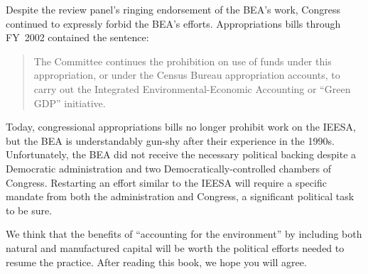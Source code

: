 Despite the review panel's ringing endorsement of the BEA's work,
Congress continued to expressly forbid the BEA's efforts.
Appropriations bills through FY~2002 contained the sentence:

\begin{quote}
	The Committee continues the prohibition on use of funds under this appropriation,
	or under the Census Bureau appropriation accounts,
	to carry out the Integrated Environmental-Economic Accounting or ``Green GDP'' initiative.
\end{quote}

Today, congressional appropriations bills no longer prohibit work on the IEESA,
but the BEA is understandably gun-shy after their experience in the 1990s.
Unfortunately, the BEA did not receive the necessary political backing
despite a Democratic administration
and two Democratically-controlled chambers of Congress.
Restarting an effort similar to the IEESA will require a specific
mandate from both the administration and Congress, 
a significant political task to be sure.

We think that the benefits of ``accounting for the environment'' 
by including both natural and manufactured capital
will be worth the political efforts needed
to resume the practice.
After reading this book, we hope you will agree.


% 
% 
% 
% 

